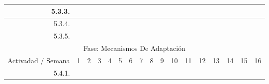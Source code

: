 \documentclass[12pt]{article}
\begin{document}
\begin{table}[H]
{\begin{tabular}{|rllllllllllllllll|}
        \multicolumn{1}{|r|}{5.3.3.} & \multicolumn{1}{l|}{} & \multicolumn{1}{l|}{} & \multicolumn{1}{l|}{} & \multicolumn{1}{l|}{} & \multicolumn{1}{l|}{} & \multicolumn{1}{l|}{} & \multicolumn{1}{l|}{} & \multicolumn{1}{c|}{\cellcolor[HTML]{A4C2F4}} & \multicolumn{1}{c|}{\cellcolor[HTML]{B4A7D6}} & \multicolumn{1}{l|}{} & \multicolumn{1}{l|}{} & \multicolumn{1}{l|}{} & \multicolumn{1}{l|}{} & \multicolumn{1}{l|}{} & \multicolumn{1}{l|}{} &  \\ \hline
        \multicolumn{1}{|r|}{5.3.4.} & \multicolumn{1}{l|}{} & \multicolumn{1}{l|}{} & \multicolumn{1}{l|}{} & \multicolumn{1}{l|}{} & \multicolumn{1}{l|}{} & \multicolumn{1}{l|}{} & \multicolumn{1}{c|}{\cellcolor[HTML]{A4C2F4}} & \multicolumn{1}{c|}{\cellcolor[HTML]{A4C2F4}} & \multicolumn{1}{c|}{\cellcolor[HTML]{B4A7D6}} & \multicolumn{1}{c|}{\cellcolor[HTML]{B4A7D6}} & \multicolumn{1}{l|}{} & \multicolumn{1}{l|}{} & \multicolumn{1}{l|}{} & \multicolumn{1}{l|}{} & \multicolumn{1}{l|}{} &  \\ \hline
        \multicolumn{1}{|r|}{5.3.5.} & \multicolumn{1}{l|}{} & \multicolumn{1}{l|}{} & \multicolumn{1}{l|}{} & \multicolumn{1}{l|}{} & \multicolumn{1}{l|}{} & \multicolumn{1}{l|}{} & \multicolumn{1}{l|}{} & \multicolumn{1}{l|}{} & \multicolumn{1}{l|}{} & \multicolumn{1}{c|}{\cellcolor[HTML]{B4A7D6}} & \multicolumn{1}{l|}{} & \multicolumn{1}{l|}{} & \multicolumn{1}{l|}{} & \multicolumn{1}{l|}{} & \multicolumn{1}{l|}{} &  \\ \hline
        \multicolumn{17}{|c|}{\cellcolor[HTML]{D9D9D9}Fase: Mecanismos De Adaptación} \\ \hline
        \multicolumn{1}{|l|}{\cellcolor[HTML]{D9D9D9}Activadad / Semana} & \multicolumn{1}{c|}{\cellcolor[HTML]{B6D7A8}1} & \multicolumn{1}{c|}{\cellcolor[HTML]{B6D7A8}2} & \multicolumn{1}{c|}{\cellcolor[HTML]{B6D7A8}3} & \multicolumn{1}{c|}{\cellcolor[HTML]{B6D7A8}4} & \multicolumn{1}{c|}{\cellcolor[HTML]{A4C2F4}5} & \multicolumn{1}{c|}{\cellcolor[HTML]{A4C2F4}6} & \multicolumn{1}{c|}{\cellcolor[HTML]{A4C2F4}7} & \multicolumn{1}{c|}{\cellcolor[HTML]{A4C2F4}8} & \multicolumn{1}{c|}{\cellcolor[HTML]{B4A7D6}9} & \multicolumn{1}{c|}{\cellcolor[HTML]{B4A7D6}10} & \multicolumn{1}{c|}{\cellcolor[HTML]{B4A7D6}11} & \multicolumn{1}{c|}{\cellcolor[HTML]{B4A7D6}12} & \multicolumn{1}{c|}{\cellcolor[HTML]{EA9999}13} & \multicolumn{1}{c|}{\cellcolor[HTML]{EA9999}14} & \multicolumn{1}{c|}{\cellcolor[HTML]{EA9999}15} & \multicolumn{1}{c|}{\cellcolor[HTML]{EA9999}16} \\ \hline
        \multicolumn{1}{|r|}{5.4.1.} & \multicolumn{1}{l|}{} & \multicolumn{1}{l|}{} & \multicolumn{1}{l|}{} & \multicolumn{1}{l|}{} & \multicolumn{1}{l|}{} & \multicolumn{1}{l|}{} & \multicolumn{1}{l|}{} & \multicolumn{1}{l|}{} & \multicolumn{1}{l|}{} & \multicolumn{1}{c|}{\cellcolor[HTML]{B4A7D6}} & \multicolumn{1}{c|}{\cellcolor[HTML]{B4A7D6}} & \multicolumn{1}{l|}{} & \multicolumn{1}{l|}{} & \multicolumn{1}{l|}{} & \multicolumn{1}{l|}{} &  \\ \hline

\end{tabular}}
\end{table}
\end{document}
